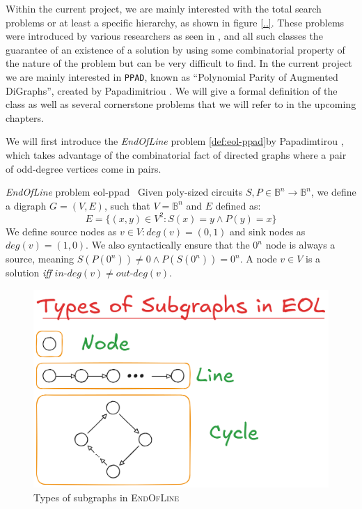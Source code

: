 Within the current project, we are mainly interested with the total search problems or at least a specific hierarchy,
as shown in figure \ref{..}. These problems were introduced by various researchers as seen in {},
and all such classes the guarantee of an existence of a solution by using
some combinatorial property of the nature of the problem but can be very difficult to find. In the current project we are mainly interested
in \texttt{PPAD}, known as ``Polynomial Parity of Augmented DiGraphs'', created by Papadimitriou \cite{papadimitriou_ComplexityParityArgument_1994}.
We will give a formal definition of the class as well as several cornerstone problems that we will refer to in the upcoming chapters.

We will first introduce the \textit{EndOfLine} problem \ref{def:eol-ppad}by Papadimtirou \cite{papadimitriou_ComplexityParityArgument_1994},
which takes advantage of the combinatorial fact of directed graphs where a pair of odd-degree vertices come in pairs.

\begin{definitionbox}{\textit{EndOfLine} problem \cite{papadimitriou_ComplexityParityArgument_1994}}{eol-ppad}\
    \label{def:eol-ppad}
    Given poly-sized circuits $S, P \in \mathbb{B}^n \to \mathbb{B}^n$,
    we define a digraph $G = (V,E)$, such that $V= \mathbb{B}^n$ and $E$ defined as:
    $$
        E = \{(x,y) \in V^2: S(x) = y \wedge P(y) = x\}
    $$
    We define source nodes as $v \in V: \textit{deg}(v) = (0,1)$  and sink nodes as
    $\textit{deg}(v) = (1,0)$.
    We also syntactically ensure that the $0^n$ node is always a source, meaning
    $S(P(0^n)) \neq 0 \wedge P(S(0^n)) = 0^n$.
    A node $v \in V$ is a solution \textit{iff} $\textit{in-deg}(v) \neq \textit{out-deg}(v)$.
\end{definitionbox}

\begin{figure}
    \centering
    \includegraphics[width=0.7\linewidth]{assets/eol-subgraphs.png}
    \caption{Types of subgraphs in \textsc{EndOfLine}}
    \label{fig:eol-subgraphs}
\end{figure}


